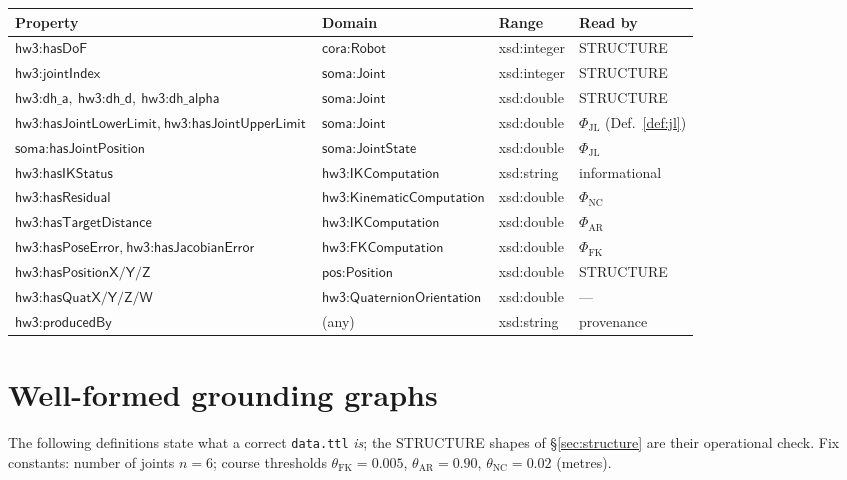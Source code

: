 \documentclass[11pt,a4paper]{article}
\newcommand{\IRI}[1]{\textsf{#1}}                    %
\newcommand{\dbl}{\IRI{xsd{:}double}}
\begin{document}
\begin{center}\scriptsize
\begin{tabular}{@{}llll@{}}
\toprule
Property & Domain & Range & Read by \\
\midrule
$\IRI{hw3{:}hasDoF}$ & $\IRI{cora{:}Robot}$ & \IRI{xsd{:}integer} & \textsf{STRUCTURE} \\
$\IRI{hw3{:}jointIndex}$ & $\IRI{soma{:}Joint}$ & \IRI{xsd{:}integer} & \textsf{STRUCTURE} \\
$\IRI{hw3{:}dh\_a},\ \IRI{hw3{:}dh\_d},\ \IRI{hw3{:}dh\_alpha}$ & $\IRI{soma{:}Joint}$ & \dbl & \textsf{STRUCTURE} \\
$\IRI{hw3{:}hasJointLowerLimit},\ \IRI{hw3{:}hasJointUpperLimit}$ & $\IRI{soma{:}Joint}$ & \dbl & $\Phi_{\mathrm{JL}}$ (Def.~\ref{def:jl}) \\
$\IRI{soma{:}hasJointPosition}$ & $\IRI{soma{:}JointState}$ & \dbl & $\Phi_{\mathrm{JL}}$ \\
$\IRI{hw3{:}hasIKStatus}$ & $\IRI{hw3{:}IKComputation}$ & \IRI{xsd{:}string} & informational \\
$\IRI{hw3{:}hasResidual}$ & $\IRI{hw3{:}KinematicComputation}$ & \dbl & $\Phi_{\mathrm{NC}}$ \\
$\IRI{hw3{:}hasTargetDistance}$ & $\IRI{hw3{:}IKComputation}$ & \dbl & $\Phi_{\mathrm{AR}}$ \\
$\IRI{hw3{:}hasPoseError},\ \IRI{hw3{:}hasJacobianError}$ & $\IRI{hw3{:}FKComputation}$ & \dbl & $\Phi_{\mathrm{FK}}$ \\
$\IRI{hw3{:}hasPositionX/Y/Z}$ & $\IRI{pos{:}Position}$ & \dbl & \textsf{STRUCTURE} \\
$\IRI{hw3{:}hasQuatX/Y/Z/W}$ & $\IRI{hw3{:}QuaternionOrientation}$ & \dbl & --- \\
$\IRI{hw3{:}producedBy}$ & (any) & \IRI{xsd{:}string} & provenance \\
\bottomrule\end{tabular}
\end{center}

\section{Well-formed grounding graphs}\label{sec:wf}

The following definitions state what a correct \texttt{data.ttl} \emph{is}; the
\textsf{STRUCTURE} shapes of \S\ref{sec:structure} are their operational check.
Fix constants: number of joints $n = 6$; course thresholds
$\theta_{\mathrm{FK}} = 0.005$, $\theta_{\mathrm{AR}} = 0.90$,
$\theta_{\mathrm{NC}} = 0.02$ (metres).
\end{document}
